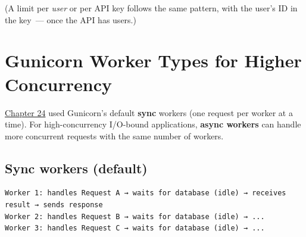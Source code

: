 \begin{codebox}[short]

\begin{Shaded}
\begin{Highlighting}[]
\NormalTok{(}\OperatorTok{=}\NormalTok{[}\NormalTok{])}
\OperatorTok{=}\OperatorTok{=}\NormalTok{)  }
\end{Highlighting}
\end{Shaded}

\end{codebox}

\noindent{}(A limit per \emph{user} or per API key follows the same pattern, with the user's ID in the key~--- once the API has users.)

\setcounter{section}{7}
\section{Gunicorn Worker Types for Higher Concurrency}\label{36-scaling-load:368-gunicorn-worker-types-for-higher-concurrency}

\hyperref[ch:24-process-startup]{Chapter 24} used Gunicorn's default \textbf{sync} workers (one request per worker at a time). For high-concurrency I/O-bound applications, \textbf{async workers} can handle more concurrent requests with the same number of workers.

\subsection*{Sync workers (default)}\label{36-scaling-load:sync-workers-default}

\begin{outputbox}[short]
\begin{Verbatim}[fontsize=\codesize, breaklines, breakanywhere, breaksymbolleft={\tiny\textcolor{muted}{$\hookrightarrow$}}]
Worker 1: handles Request A → waits for database (idle) → receives result → sends response
Worker 2: handles Request B → waits for database (idle) → ...
Worker 3: handles Request C → waits for database (idle) → ...
\end{Verbatim}
\end{outputbox}

